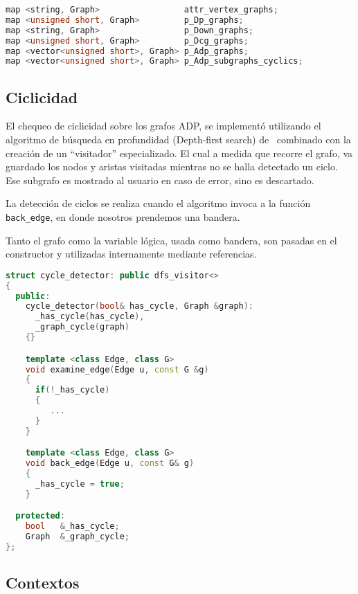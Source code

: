\begin{lstlisting}[language=C++, basicstyle=\scriptsize, linewidth=11.5cm]
map <string, Graph>                 attr_vertex_graphs;
map <unsigned short, Graph>         p_Dp_graphs;
map <string, Graph>                 p_Down_graphs;
map <unsigned short, Graph>         p_Dcg_graphs;
map <vector<unsigned short>, Graph> p_Adp_graphs;
map <vector<unsigned short>, Graph> p_Adp_subgraphs_cyclics;
\end{lstlisting}

\subsection{Ciclicidad}

El chequeo de ciclicidad sobre los grafos ADP, se implementó utilizando el algoritmo de búsqueda en profundidad (Depth-first search) de \boost\ combinado con la creación de un ``visitador'' especializado. El cual a medida que recorre el grafo, va guardado los nodos y aristas visitadas mientras no se halla detectado un ciclo. Ese subgrafo es mostrado al usuario en caso de error, sino es descartado.

La detección de ciclos se realiza cuando el algoritmo invoca a la función \texttt{back\_edge}, en donde nosotros prendemos una bandera.

Tanto el grafo como la variable lógica, usada como bandera, son pasadas en el constructor y utilizadas internamente mediante referencias.

\begin{lstlisting}[language=C++, basicstyle=\scriptsize, columns=fullflexible, linewidth=8.5cm]
struct cycle_detector: public dfs_visitor<>
{
  public:
    cycle_detector(bool& has_cycle, Graph &graph):
      _has_cycle(has_cycle), 
      _graph_cycle(graph)
    {}

    template <class Edge, class G>
    void examine_edge(Edge u, const G &g)
    {
      if(!_has_cycle)
      {
         ...
      }
    }

    template <class Edge, class G>
    void back_edge(Edge u, const G& g)
    {
      _has_cycle = true;
    }

  protected:
    bool   &_has_cycle;
    Graph  &_graph_cycle;
};
\end{lstlisting}

\subsection{Contextos}


